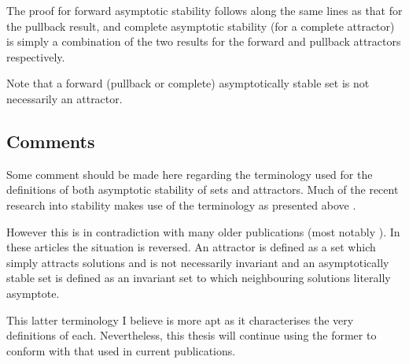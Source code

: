 The proof for forward asymptotic stability follows along the same lines as
that for the pullback result, and complete asymptotic stability (for a
complete attractor) is simply a combination of the two results for
the forward and pullback attractors respectively.

Note that a forward (pullback or complete) asymptotically stable set is not
necessarily an attractor.

\subsection{Comments}
Some comment should be made here regarding the terminology used for the
definitions of both asymptotic stability of sets and attractors. Much of the
recent research into stability makes use of the terminology as presented above
\cite{ChKlSc98,PkSt97,Sc92,St94}.

However this is in contradiction with many older publications (most notably
\cite{BhSz67}). In these articles the situation is reversed. An attractor
is defined as a set which simply attracts solutions and is not necessarily
invariant and an asymptotically stable set is defined as an invariant
set to which neighbouring solutions literally asymptote.

This latter terminology I believe is more apt as it characterises the very
definitions of each. Nevertheless, this thesis will continue using the former to conform with that used in current publications.

\endinput
